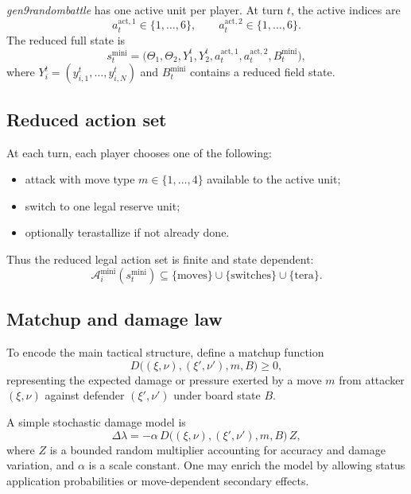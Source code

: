 \documentclass[aps,pre,twocolumn,superscriptaddress,nofootinbib]{revtex4-2}
\newcommand{\cA}{\mathcal{A}}
\theoremstyle{definition}
\theoremstyle{plain}
\begin{document}
\emph{gen9randombattle} has one active unit per player. At turn $t$, the active indices are
\begin{equation}
    a_t^{\mathrm{act},1} \in \{1,\dots,6\},
    \qquad
    a_t^{\mathrm{act},2} \in \{1,\dots,6\}.
\end{equation}
The reduced full state is
\begin{equation}
    s_t^{\mathrm{mini}} = \big(\Theta_1,\Theta_2,Y_1^t,Y_2^t,a_t^{\mathrm{act},1},a_t^{\mathrm{act},2},B_t^{\mathrm{mini}}\big),
\end{equation}
where $Y_i^t=(y_{i,1}^t,\dots,y_{i,N}^t)$ and $B_t^{\mathrm{mini}}$ contains a reduced field state.

\subsection{Reduced action set}

At each turn, each player chooses one of the following:
\begin{itemize}
    \item attack with move type $m \in \{1,\dots,4\}$ available to the active unit;
    \item switch to one legal reserve unit;
    \item optionally terastallize if not already done.
\end{itemize}
Thus the reduced legal action set is finite and state dependent:
\begin{equation}
    \cA_i^{\mathrm{mini}}(s_t^{\mathrm{mini}})
    \subseteq
    \{\text{moves}\}\cup\{\text{switches}\}\cup\{\text{tera}\}.
\end{equation}

\subsection{Matchup and damage law}

To encode the main tactical structure, define a matchup function
\begin{equation}
    D\big((\xi,\nu),(\xi',\nu'),m,B\big) \ge 0,
\end{equation}
representing the expected damage or pressure exerted by a move $m$ from attacker $(\xi,\nu)$ against defender $(\xi',\nu')$ under board state $B$.

A simple stochastic damage model is
\begin{equation}
    \Delta \lambda = - \alpha \, D\big((\xi,\nu),(\xi',\nu'),m,B\big) \, Z,
\end{equation}
where $Z$ is a bounded random multiplier accounting for accuracy and damage variation, and $\alpha$ is a scale constant. One may enrich the model by allowing status application probabilities or move-dependent secondary effects.
\end{document}
